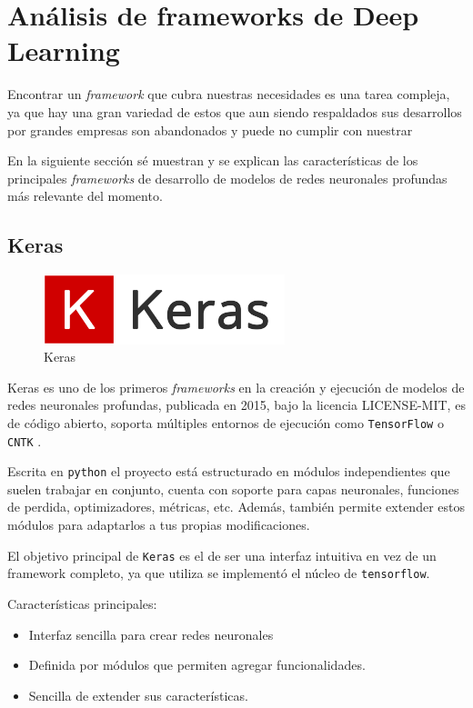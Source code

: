 \section{Análisis de frameworks de Deep Learning}

Encontrar un \textit{framework} que cubra nuestras necesidades es una tarea compleja, ya que hay una gran variedad de estos que aun siendo respaldados sus desarrollos por grandes empresas son abandonados y puede no cumplir con nuestrar

En la siguiente sección sé muestran y se explican las características de los principales \textit{frameworks} de desarrollo de modelos de redes neuronales profundas más relevante del momento.

\subsection{Keras}

\begin{figure}[H]
    \centering
    \includegraphics[width=7cm]{figures/assets/Logo_Keras.png}
    \caption{Keras}
    \label{fig:lib-keras}
\end{figure}

Keras \cite{chollet2015keras} es uno de los primeros \textit{frameworks} en la creación y ejecución de modelos de redes neuronales profundas, publicada en 2015, bajo la licencia \gls{LICENSE-MIT}, es de código abierto, soporta múltiples entornos de ejecución como \texttt{TensorFlow} \cite{Abadi_TensorFlow_Large-scale_machine_2015} o \texttt{CNTK} \cite{10.1145/2939672.2945397}.

Escrita en \texttt{python} el proyecto está estructurado en módulos independientes que suelen trabajar en conjunto, cuenta con soporte para capas neuronales, funciones de perdida, optimizadores, métricas, etc. Además, también permite extender estos módulos para adaptarlos a tus propias modificaciones. 

El objetivo principal de \texttt{Keras} es el de ser una interfaz intuitiva en vez de un framework completo, ya que utiliza se implementó el núcleo de \texttt{tensorflow}.

Características principales:
\begin{itemize}
    \item Interfaz sencilla para crear redes neuronales
    \item Definida por módulos que permiten agregar funcionalidades.
    \item Sencilla de extender sus características.
\end{itemize}

